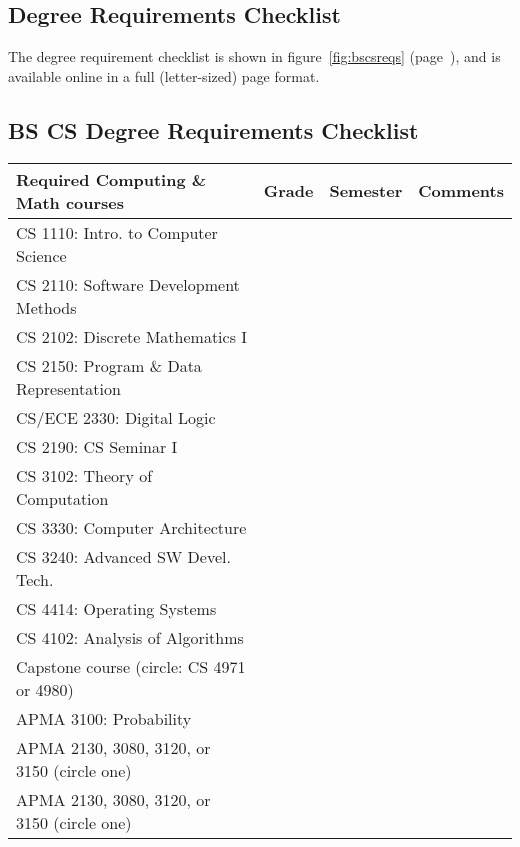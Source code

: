 \subsection{Degree Requirements Checklist}

The degree requirement checklist is shown in figure~\ref{fig:bscsreqs}
(page~\pageref{fig:bscsreqs}), and is available
online in a full
(letter-sized) page format.

\begin{figure*}
\subsection*{BS CS Degree Requirements Checklist}
\label{fig:bscsreqs}
\begin{center}
\begin{tabular}{|l|l|l|p{1.2in}|} \hline
\bf Required Computing \& Math courses & \bf Grade & \bf Semester &
\bf Comments \\ \hline \hline
CS 1110: Intro. to Computer Science & & & \\ \hline
CS 2110: Software Development Methods & & & \\ \hline
CS 2102: Discrete Mathematics I & & & \\ \hline
CS 2150: Program \& Data Representation & & & \\ \hline
CS/ECE 2330: Digital Logic & & & \\ \hline
CS 2190: CS Seminar I & & & \\ \hline
CS 3102: Theory of Computation & & & \\ \hline
CS 3330: Computer Architecture & & & \\ \hline
CS 3240: Advanced SW Devel. Tech. & & & \\ \hline
CS 4414: Operating Systems & & & \\ \hline
CS 4102: Analysis of Algorithms & & & \\ \hline
Capstone course (circle: CS 4971 or 4980) & & & \\ \hline
APMA 3100: Probability & & & \\ \hline
APMA 2130, 3080, 3120, or 3150 (circle one) & & & \\ \hline
APMA 2130, 3080, 3120, or 3150 (circle one) & & & \\ \hline
\end{tabular}


\end{center}
\end{figure*}
